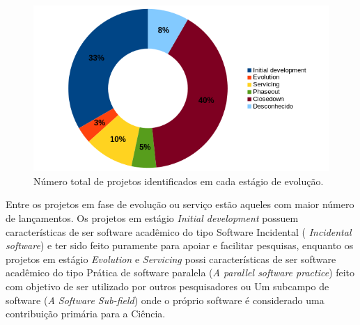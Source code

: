 \begin{figure}[h]
  \begin{minipage}{0.5\textwidth}
    \centering
    \includegraphics[scale=0.55]{imagens/life-cycle-pie.png}
  \end{minipage}
  \begin{minipage}{0.5\textwidth}
    \centering
    
  \end{minipage}
  \caption{Número total de projetos identificados em cada estágio de evolução.}
  \label{life-cycle}
\end{figure}

Entre os projetos em fase de evolução ou serviço estão aqueles com maior número
de lançamentos. Os projetos em estágio {\it Initial development} possuem
características de ser software acadêmico do tipo Software Incidental ({\it
Incidental software}) e ter sido feito puramente para apoiar e facilitar
pesquisas, enquanto os projetos em estágio {\it Evolution} e {\it Servicing}
possi características de ser software acadêmico do tipo Prática de software
paralela ({\it A parallel software practice}) feito com objetivo de ser
utilizado por outros pesquisadores ou Um subcampo de software ({\it A Software
Sub-field}) onde o próprio software é considerado uma contribuição primária
para a Ciência.

